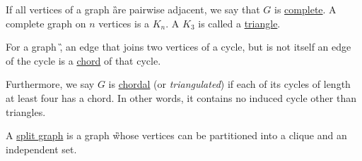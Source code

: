 \begin{graphclass}[Complete]
If all vertices of a graph \G are pairwise adjacent, we say that $G$ is \underline{complete}. 
A complete graph on $n$ vertices is a $K_n$. A $K_3$ is called a \underline{triangle}.
\end{graphclass}



\begin{graphclass}[Chordal]
For a graph \G, an edge that joins two vertices of a cycle, but is not itself an edge of the cycle is a \underline{chord} of that cycle.

Furthermore, we say $G$ is \underline{chordal} (or \textit{triangulated}) if each of its cycles of length at least four has a chord. In other words, it contains no induced cycle other than triangles.

\end{graphclass}

\begin{graphclass}[Split]
A \underline{split graph} is a graph \G whose vertices can be partitioned into a clique and an independent set.    
\end{graphclass}


    


